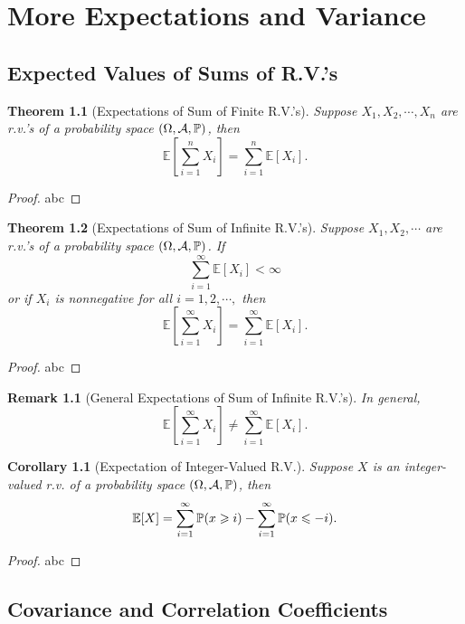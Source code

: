 \documentclass[openany,12pt]{book}
\newtheorem{theorem}{Theorem}[chapter]
\newtheorem{corollary}{Corollary}[chapter]
\newtheorem{remark}{Remark}[chapter]
\begin{document}
\chapter{More Expectations and Variance}

\section{Expected Values of Sums of R.V.'s}

\begin{theorem}[Expectations of Sum of Finite R.V.'s]
  Suppose $X_{1}, X_{2}, \cdots,X_{n}$ are r.v.'s of a probability space $(\Omega,\mathcal{A},\mathbb{P})$, then
  \[\mathbb{E}\left[ \sum_{i = 1}^{n}X_{i} \right] = \sum_{i = 1}^{n}{\mathbb{E}[ X_{i}]}.\]
\end{theorem}

\begin{proof}
  abc
\end{proof}

\begin{theorem}[Expectations of Sum of Infinite R.V.'s]
  Suppose $X_{1}, X_{2}, \cdots$ are r.v.'s of a probability space $(\Omega,\mathcal{A},\mathbb{P})$. If \[\sum_{i = 1}^{\infty}{\mathbb{E}[ X_{i}]} < \infty\] or if
  $X_{i}$ is nonnegative for all $i = 1,2, \cdots,$ then
  \[\mathbb{E}\left[ \sum_{i = 1}^{\infty}X_{i} \right] = \sum_{i = 1}^{\infty}{\mathbb{E}[ X_{i}]}.\]
\end{theorem}

\begin{proof}
  abc
\end{proof}

\begin{remark}[General Expectations of Sum of Infinite R.V.'s]
  In general,
  \[\mathbb{E}\left[ \sum_{i = 1}^{\infty}X_{i} \right] \neq \sum_{i = 1}^{\infty}{\mathbb{E}[ X_{i}]}.\]
\end{remark}

\begin{corollary}[Expectation of Integer-Valued R.V.]
  Suppose $X$ is an integer-valued r.v. of a probability space $(\Omega,\mathcal{A},\mathbb{P})$, then
  \[\mathbb{E}[X] = \sum_{i = 1}^{\infty}{\mathbb{P}(x \geqslant i)} - \sum_{i = 1}^{\infty}{\mathbb{P}( x \leqslant - i)}.\]
\end{corollary}

\begin{proof}
  abc
\end{proof}

\section{Covariance and Correlation Coefficients}
\end{document}
